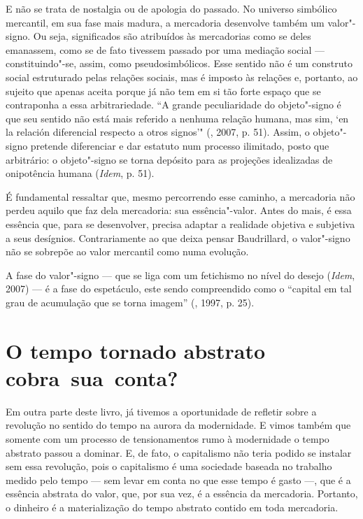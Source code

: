 E não se trata de nostalgia ou de apologia do passado. No universo
simbólico mercantil, em sua fase mais madura, a mercadoria desenvolve
também um valor"-signo. Ou seja, significados são atribuídos às
mercadorias como se deles emanassem, como se de fato tivessem passado
por uma mediação social --- constituindo"-se, assim, como
pseudosimbólicos. Esse sentido não é um construto social
estruturado pelas relações sociais, mas é imposto às relações e,
portanto, ao sujeito que apenas aceita porque já não tem em si tão forte
espaço que se contraponha a essa arbitrariedade. ``A grande
peculiaridade do objeto"-signo é que seu sentido não está mais referido a
nenhuma relação humana, mas sim, `en la relación diferencial respecto a
otros signos'" (, 2007, p. 51). Assim, o objeto"-signo pretende
diferenciar e dar estatuto num processo ilimitado, posto que arbitrário:
o objeto"-signo se torna depósito para as projeções idealizadas de
onipotência humana (\emph{Idem}, p. 51).

É fundamental ressaltar que, mesmo percorrendo esse caminho, a
mercadoria não perdeu aquilo que faz dela mercadoria: sua
essência"-valor. Antes do mais, é essa essência que, para se desenvolver,
precisa adaptar a realidade objetiva e subjetiva a seus desígnios.
Contrariamente ao que deixa pensar Baudrillard, o valor"-signo não se
sobrepõe ao valor mercantil como numa evolução.

A fase do valor"-signo --- que se liga com um fetichismo no nível do
desejo (\emph{Idem}, 2007) --- é a fase do espetáculo, este sendo
compreendido como o ``capital em tal grau de acumulação que se torna
imagem'' (, 1997, p. 25).

\section{O tempo tornado abstrato cobra~sua~conta?}

Em outra parte deste livro, já tivemos a oportunidade de refletir sobre a revolução no sentido do tempo na aurora da
modernidade. E vimos também que somente com um processo de
tensionamentos rumo à modernidade o tempo abstrato passou a dominar. E,
de fato, o capitalismo não teria podido se instalar sem essa revolução,
pois o capitalismo é uma sociedade baseada no trabalho medido pelo tempo
--- sem levar em conta no que esse tempo é gasto ---, que é a essência
abstrata do valor, que, por sua vez, é a essência da mercadoria.
Portanto, o dinheiro é a materialização do tempo abstrato contido em
toda mercadoria.

